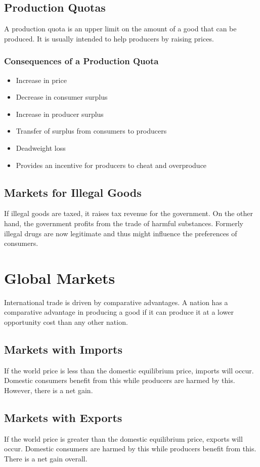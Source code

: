 \documentclass[letterpaper, 12pt]{article}
\begin{document}
\subsection{Production Quotas}
A production quota is an upper limit on the amount of a good that can be
produced. It is usually intended to help producers by raising prices.

\subsubsection{Consequences of a Production Quota}
\begin{itemize}
  \item Increase in price
  \item Decrease in consumer surplus
  \item Increase in producer surplus
  \item Transfer of surplus from consumers to producers
  \item Deadweight loss
  \item Provides an incentive for producers to cheat and overproduce
\end{itemize}

\subsection{Markets for Illegal Goods}
If illegal goods are taxed, it raises tax revenue for the government. On the
other hand, the government profits from the trade of harmful substances.
Formerly illegal drugs are now legitimate and thus might influence the
preferences of consumers.

\section{Global Markets}
International trade is driven by comparative advantages. A nation has a
comparative advantage in producing a good if it can produce it at a lower
opportunity cost than any other nation.

\subsection{Markets with Imports}
If the world price is less than the domestic equilibrium price, imports will
occur. Domestic consumers benefit from this while producers are harmed by this.
However, there is a net gain.

\subsection{Markets with Exports}
If the world price is greater than the domestic equilibrium price, exports will
occur. Domestic consumers are harmed by this while producers benefit from this.
There is a net gain overall.
\end{document}
